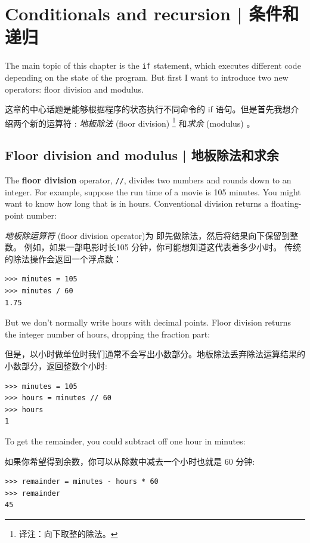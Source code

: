 


\chapter{Conditionals and recursion  |  条件和递归}

The main topic of this chapter is the {\tt if} statement, which
executes different code depending on the state of the program.
But first I want to introduce two new operators: floor division
and modulus.

这章的中心话题是能够根据程序的状态执行不同命令的 if 语句。但是首先我想介绍两个新的运算符 : {\em 地板除法} (floor division) \footnote{译注：向下取整的除法。} 和{\em 求余} (modulus) 。

\section{Floor division and modulus  |  地板除法和求余}

The {\bf floor division} operator, \verb"//", divides
two numbers and rounds down to an integer.  For example, suppose the
run time of a movie is 105 minutes.  You might want to know how
long that is in hours.  Conventional division
returns a floating-point number:

{\em 地板除运算符} (floor division operator)为 \li{//} 即先做除法，然后将结果向下保留到整数。 例如，如果一部电影时长105 分钟，你可能想知道这代表着多少小时。 传统的除法操作会返回一个浮点数：

\begin{lstlisting}
>>> minutes = 105
>>> minutes / 60
1.75
\end{lstlisting}

But we don't normally write hours with decimal points.  Floor
division returns the integer number of hours, dropping the
fraction part:

但是，以小时做单位时我们通常不会写出小数部分。地板除法丢弃除法运算结果的小数部分，返回整数个小时:

\begin{lstlisting}
>>> minutes = 105
>>> hours = minutes // 60
>>> hours
1
\end{lstlisting}

To get the remainder, you could subtract off one hour in minutes:

如果你希望得到余数，你可以从除数中减去一个小时也就是 60 分钟:

\begin{lstlisting}
>>> remainder = minutes - hours * 60
>>> remainder
45
\end{lstlisting}

